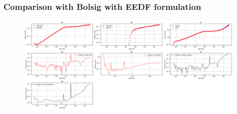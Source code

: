 \documentclass[mathserif, aspectratio=169]{beamer}
\begin{document}
\begin{frame}
	\frametitle{\small Comparison with Bolsig with EEDF formulation}
	\begin{figure}
		\includegraphics[width=\textwidth]{PDE_vs_BOLSIG_G0_G2_collop_approx.png}
	\end{figure}
\end{frame}
\end{document}
